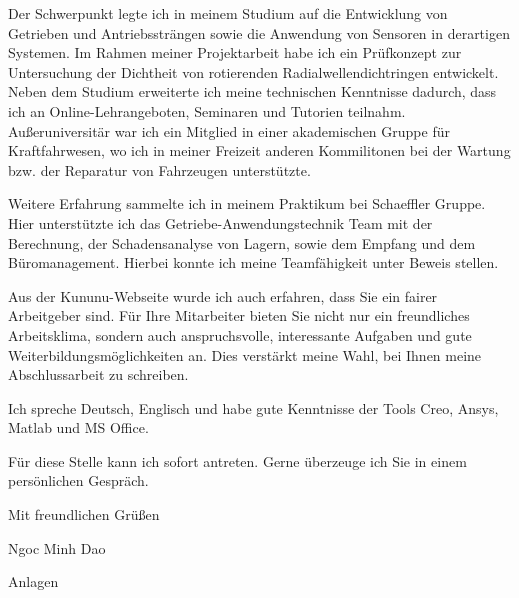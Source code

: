 \documentclass[11pt,a4paper]{letter}
\begin{document}
Der Schwerpunkt legte ich in meinem Studium auf die Entwicklung von Getrieben und Antriebssträngen sowie die Anwendung von Sensoren in derartigen Systemen.
Im Rahmen meiner Projektarbeit habe ich ein Prüfkonzept zur Untersuchung der Dichtheit von rotierenden Radialwellendichtringen entwickelt.
Neben dem Studium erweiterte ich meine technischen Kenntnisse dadurch, dass ich an Online-Lehrangeboten, Seminaren und Tutorien teilnahm.
Außeruniversitär war ich ein Mitglied in einer akademischen Gruppe für Kraftfahrwesen, wo ich in meiner Freizeit anderen Kommilitonen bei der Wartung bzw. der Reparatur von Fahrzeugen unterstützte.


Weitere Erfahrung sammelte ich in meinem Praktikum bei Schaeffler Gruppe.
Hier unterstützte ich das Getriebe-Anwendungstechnik Team mit der Berechnung, der Schadensanalyse von Lagern, sowie dem Empfang und dem Büromanagement.
Hierbei konnte ich meine Teamfähigkeit unter Beweis stellen.

Aus der Kununu-Webseite wurde ich auch erfahren, dass Sie ein fairer Arbeitgeber sind.
Für Ihre Mitarbeiter bieten Sie nicht nur ein freundliches Arbeitsklima, sondern auch anspruchsvolle, interessante Aufgaben und gute Weiterbildungsmöglichkeiten an.
Dies verstärkt meine Wahl, bei Ihnen meine Abschlussarbeit zu schreiben.

Ich spreche Deutsch, Englisch und habe gute Kenntnisse der Tools Creo, Ansys, Matlab und MS Office.

Für diese Stelle kann ich sofort antreten.
Gerne überzeuge ich Sie in einem persönlichen Gespräch.

Mit freundlichen Grüßen

Ngoc Minh Dao

Anlagen
\end{document}

